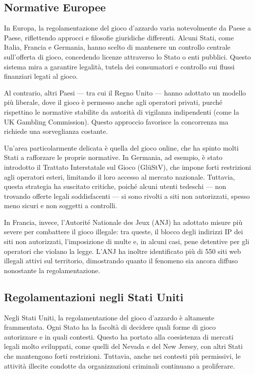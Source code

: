 \documentclass[a4paper,12pt]{article}
\begin{document}
\subsection{Normative Europee}

In Europa, la regolamentazione del gioco d’azzardo varia notevolmente da Paese a Paese, riflettendo approcci e filosofie giuridiche differenti. Alcuni Stati, come Italia, Francia e Germania, hanno scelto di mantenere un controllo centrale sull’offerta di gioco, concedendo licenze attraverso lo Stato o enti pubblici. Questo sistema mira a garantire legalità, tutela dei consumatori e controllo sui flussi finanziari legati al gioco.

Al contrario, altri Paesi — tra cui il Regno Unito — hanno adottato un modello più liberale, dove il gioco è permesso anche agli operatori privati, purché rispettino le normative stabilite da autorità di vigilanza indipendenti (come la UK Gambling Commission). Questo approccio favorisce la concorrenza ma richiede una sorveglianza costante.

Un’area particolarmente delicata è quella del gioco online, che ha spinto molti Stati a rafforzare le proprie normative. In Germania, ad esempio, è stato introdotto il Trattato Interstatale sul Gioco (GlüStV), che impone forti restrizioni agli operatori esteri, limitando il loro accesso al mercato nazionale. Tuttavia, questa strategia ha suscitato critiche, poiché alcuni utenti tedeschi — non trovando offerte legali soddisfacenti — si sono rivolti a siti non autorizzati, spesso meno sicuri e non soggetti a controlli.

In Francia, invece, l’Autorité Nationale des Jeux (ANJ) ha adottato misure più severe per combattere il gioco illegale: tra queste, il blocco degli indirizzi IP dei siti non autorizzati, l’imposizione di multe e, in alcuni casi, pene detentive per gli operatori che violano la legge. L’ANJ ha inoltre identificato più di 550 siti web illegali attivi sul territorio, dimostrando quanto il fenomeno sia ancora diffuso nonostante la regolamentazione.

\subsection{Regolamentazioni negli Stati Uniti}

Negli Stati Uniti, la regolamentazione del gioco d’azzardo è altamente frammentata. Ogni Stato ha la facoltà di decidere quali forme di gioco autorizzare e in quali contesti. Questo ha portato alla coesistenza di mercati legali molto sviluppati, come quelli del Nevada e del New Jersey, con altri Stati che mantengono forti restrizioni. Tuttavia, anche nei contesti più permissivi, le attività illecite condotte da organizzazioni criminali continuano a proliferare.
\cite{banks2018taxonomy}
\end{document}
